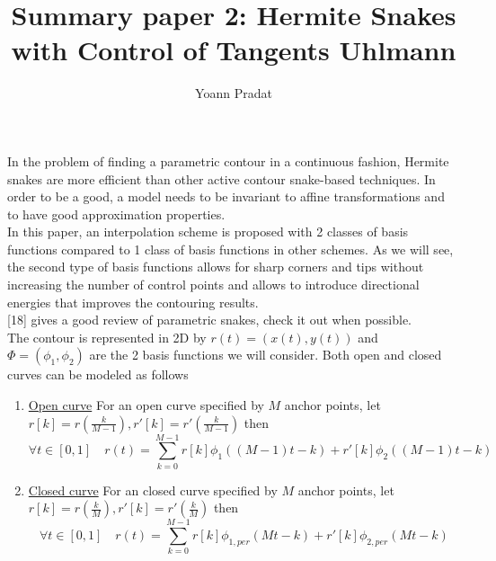 \documentclass[a4paper, 11pt]{article}
\begin{document}
\title{Summary paper 2: Hermite Snakes with Control of Tangents Uhlmann}
\author{Yoann Pradat}
\maketitle

In the problem of finding a parametric contour in a continuous fashion, Hermite snakes are more efficient than other 
active contour snake-based techniques. In order to be a good, a model needs to be invariant to affine transformations 
and to have good approximation properties. \\

In this paper, an interpolation scheme is proposed with 2 classes of basis functions compared to 1 class of basis 
functions in other schemes. As we will see, the second type of basis functions allows for sharp corners and tips without 
increasing the number of control points and allows to introduce directional energies that improves the contouring 
results. \\

[18] gives a good review of parametric snakes, check it out when possible. \\

The contour is represented in 2D by $r(t) = (x(t), y(t))$ and $\Phi = (\phi_1, \phi_2)$ are the 2 basis functions we 
will consider. Both open and closed curves can be modeled as follows

\begin{enumerate}
  \item{\underline{Open curve}} For an open curve specified by $M$ anchor points, let $r[k] = r(\frac{k}{M-1}), r'[k] = 
    r'(\frac{k}{M-1})$ then
    \begin{equation}
      \forall t \in [0, 1] \quad r(t) = \sum_{k=0}^{M-1} r[k]\phi_1((M-1)t - k) + r'[k]\phi_2((M-1)t - k)
    \end{equation}

  \item{\underline{Closed curve}} For an closed curve specified by $M$ anchor points, let $r[k] = r(\frac{k}{M}), r'[k] 
    = r'(\frac{k}{M})$ then
    \begin{equation}
      \forall t \in [0, 1] \quad r(t) = \sum_{k=0}^{M-1} r[k]\phi_{1, per}(Mt - k) + r'[k]\phi_{2, per}(Mt - k)
    \end{equation}
\end{enumerate}
\end{document}
